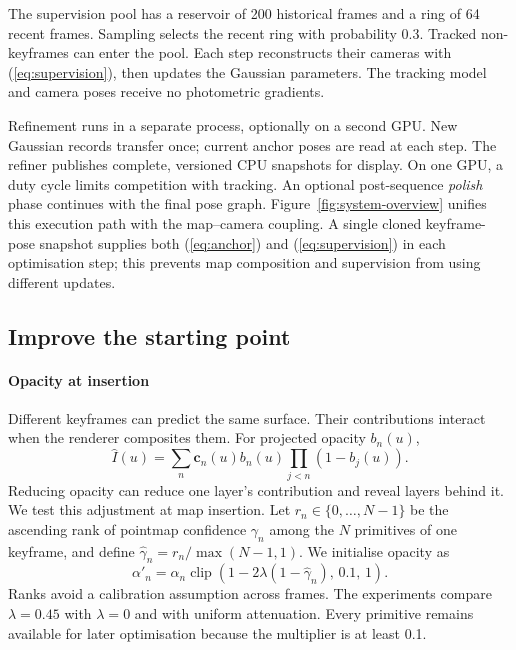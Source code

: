 The supervision pool has a reservoir of 200 historical frames and a ring of
64 recent frames. Sampling selects the recent ring with probability 0.3.
Tracked non-keyframes can enter the pool. Each step reconstructs their
cameras with (\ref{eq:supervision}), then updates the Gaussian parameters.
The tracking model and camera poses receive no photometric gradients.

Refinement runs in a separate process, optionally on a second GPU. New
Gaussian records transfer once; current anchor poses are read at each step.
The refiner publishes complete, versioned CPU snapshots for display.
On one GPU, a duty cycle limits competition with tracking. An optional
post-sequence \emph{polish} phase continues with the final pose graph.
Figure~\ref{fig:system-overview} unifies this execution path with the
map--camera coupling. A single cloned keyframe-pose snapshot supplies both
(\ref{eq:anchor}) and (\ref{eq:supervision}) in each optimisation step;
this prevents map composition and supervision from using different updates.



\subsection{Improve the starting point}
\label{sec:initialisation}
\paragraph{Opacity at insertion}
Different keyframes can predict the same surface. Their contributions
interact when the renderer composites them. For projected opacity $b_n(u)$,
\begin{equation}
  \hat I(u)=\sum_n \mathbf c_n(u)b_n(u)\prod_{j<n}(1-b_j(u)).
  \label{eq:compositing}
\end{equation}
Reducing opacity can reduce one layer's contribution and reveal layers
behind it. We test this adjustment at map insertion.
Let $r_n\in\{0,\ldots,N-1\}$ be the ascending rank of pointmap confidence
$\gamma_n$ among the $N$ primitives of one keyframe, and define
$\hat\gamma_n=r_n/\max(N-1,1)$. We initialise opacity as
\begin{equation}
  \alpha'_n=\alpha_n
    \operatorname{clip}\!\left(1-2\lambda(1-\hat\gamma_n),\,0.1,\,1\right).
  \label{eq:thin}
\end{equation}
Ranks avoid a calibration assumption across frames. The experiments compare
$\lambda=0.45$ with $\lambda=0$ and with uniform attenuation.
Every primitive remains available for later optimisation because the
multiplier is at least 0.1.

